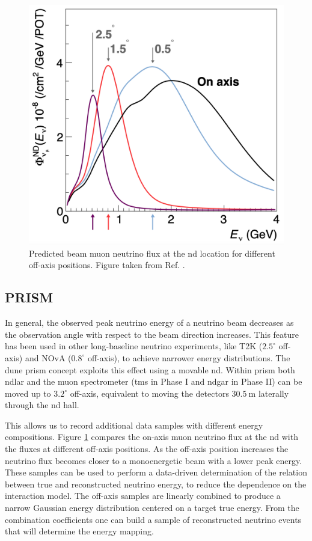 \begin{figure}[t]
	\centering
	\includegraphics[width=0.55\linewidth]{Images/DUNE/ND/prism_spectra}
	\caption[Predicted beam muon neutrino flux at the \gls{nd} location for different off-axis positions.]{Predicted beam muon neutrino flux at the \gls{nd} location for different off-axis positions. Figure taken from Ref. \cite{DUNE2021NDCDR}.}
	\label{fig:dune_prism}
\end{figure}

\subsection{PRISM}

In general, the observed peak neutrino energy of a neutrino beam decreases as the observation angle with respect to the beam direction increases. This feature has been used in other long-baseline neutrino experiments, like T2K ($2.5^{\circ}$ off-axis) and NOvA ($0.8^{\circ}$ off-axis), to achieve narrower energy distributions. The \gls{dune} \gls{prism} concept exploits this effect using a movable \gls{nd}. Within \gls{prism} both \gls{ndlar} and the muon spectrometer (\gls{tms} in Phase I and \gls{ndgar} in Phase II) can be moved up to $3.2^{\circ}$ off-axis, equivalent to moving the detectors $30.5~\mathrm{m}$ laterally through the \gls{nd} hall.

This allows us to record additional data samples with different energy compositions. Figure \ref{fig:dune_prism} compares the on-axis muon neutrino flux at the \gls{nd} with the fluxes at different off-axis positions. As the off-axis position increases the neutrino flux becomes closer to a monoenergetic beam with a lower peak energy. These samples can be used to perform a data-driven determination of the relation between true and reconstructed neutrino energy, to reduce the dependence on the interaction model. The off-axis samples are linearly combined to produce a narrow Gaussian energy distribution centered on a target true energy. From the combination coefficients one can build a sample of reconstructed neutrino events that will determine the energy mapping.

